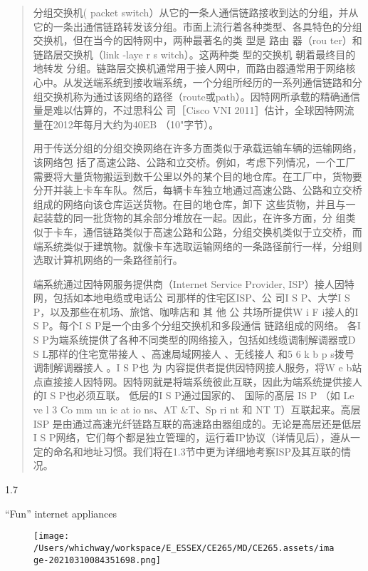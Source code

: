 \documentclass[
]{article}
\begin{document}
\begin{quote}
分组交换机( packet
switch）从它的一条人通信链路接收到达的分组，并从它的一条出通信链路转发该分组。市面上流行着各种类型、各具特色的分组交换机，但在当今的因特网中，两种最著名的类
型是 路由 器（rou ter）和链路层交换机（link -laye r s witch）。这两种类
型的交换机 朝着最终目的地转发
分组。链路层交换机通常用于接人网中，而路由器通常用于网络核心中。从发送端系统到接收端系统，一个分组所经历的一系列通信链路和分组交换机称为通过该网络的路径（route或path）。因特网所承载的精确通信量是难以估算的，不过思科公
司［Cisco VNI 2011］估计，全球因特网流量在2012年每月大约为40EB
（10"字节）。

用于传送分组的分组交换网络在许多方面类似于承载运输车辆的运输网络，该网络包
括了高速公路、公路和立交桥。例如，考虑下列情况，一个工厂需要将大量货物搬运到数千公里以外的某个目的地仓库。在工厂中，货物要分开并装上卡车车队。然后，每辆卡车独立地通过高速公路、公路和立交桥组成的网络向该仓库运送货物。在目的地仓库，卸下
这些货物，并且与一起装载的同一批货物的其余部分堆放在一起。因此，在许多方面，分
组类似于卡车，通信链路类似于高速公路和公路，分组交换机类似于立交桥，而端系统类似于建筑物。就像卡车选取运输网络的一条路径前行一样，分组则选取计算机网络的一条路径前行。

端系统通过因特网服务提供商（Internet Service Provider,
ISP）接人因特网，包括如本地电缆或电话公 司那样的住宅区ISP、公 司I S
P、大学I S P，以及那些在机场、旅馆、咖啡店和 其 他 公 共场所提供W i F
i接人的I S P。每个I S P是一个由多个分组交换机和多段通信 链路组成的网络。
各I S P为端系统提供了各种不同类型的网络接入，包括如线缆调制解调器或D S
L那样的住宅宽带接人 、高速局域网接人 、无线接人 和5 6 k b p
s拨号调制解调器接人 。I S P也 为 内容提供者提供因特网接人服务，将W e
b站点直接接人因特网。因特网就是将端系统彼此互联，因此为端系统提供接人的I
S P也必须互联。 低层的I S P通过国家的、 国际的髙层 IS P （如 Le ve l 3
Co mm un ic at io ns、AT \&T、Sp ri nt 和 NT T）互联起来。高层 ISP
是由通过高速光纤链路互联的高速路由器组成的。无论是高层还是低层I S
P网络，它们每个都是独立管理的，运行着IP协议（详情见后），遵从一定的命名和地址习惯。我们将在1.3节中更为详细地考察ISP及其互联的情况。
\end{quote}

1.7

``Fun'' internet appliances

\begin{figure}
\centering
\texttt{[image: /Users/whichway/workspace/E\_ESSEX/CE265/MD/CE265.assets/image-20210310084351698.png]}
\caption{}
\end{figure}
\end{document}
